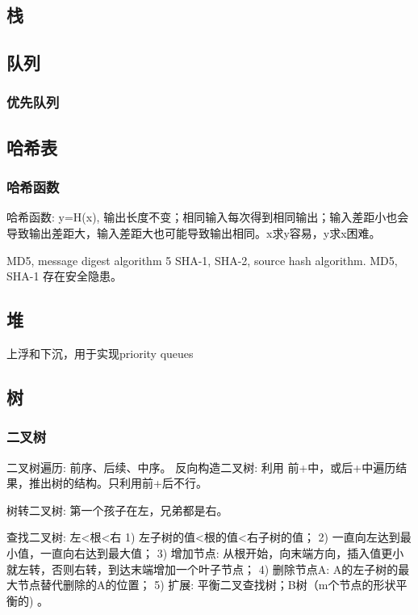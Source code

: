 \documentclass[UTF8]{../computerUniverse}
\begin{document}
\subsection{栈}


\subsection{队列}

\subsubsection{优先队列}


\subsection{哈希表}

\subsubsection{哈希函数}
哈希函数: y=H(x), 输出长度不变；相同输入每次得到相同输出；输入差距小也会导致输出差距大，输入差距大也可能导致输出相同。x求y容易，y求x困难。

MD5, message digest algorithm 5
SHA-1, SHA-2, source hash algorithm.
MD5, SHA-1 存在安全隐患。




\subsection{堆}
上浮和下沉，用于实现priority queues


\subsection{树}


\subsubsection{二叉树}

二叉树遍历: 前序、后续、中序。
反向构造二叉树: 利用 前+中，或后+中遍历结果，推出树的结构。只利用前+后不行。

树转二叉树: 第一个孩子在左，兄弟都是右。


查找二叉树: 左<根<右
1) 左子树的值<根的值<右子树的值；
2) 一直向左达到最小值，一直向右达到最大值；
3) 增加节点: 从根开始，向末端方向，插入值更小就左转，否则右转，到达末端增加一个叶子节点；
4) 删除节点A: A的左子树的最大节点替代删除的A的位置；
5) 扩展: 平衡二叉查找树；B树（m个节点的形状平衡的) 。
\end{document}
